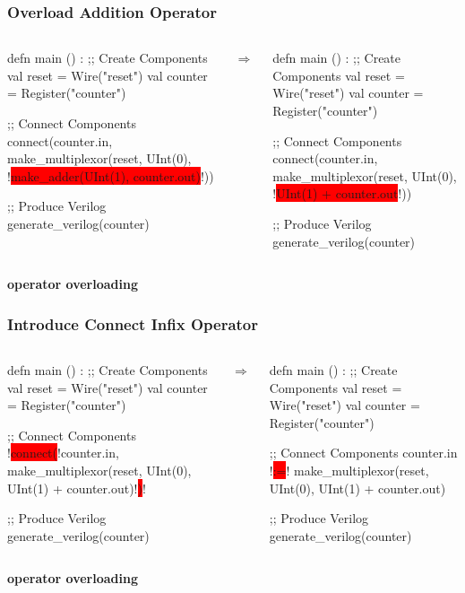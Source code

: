 \documentclass[xcolor=pdflatex,dvipsnames,table]{beamer}
\begin{document}
\begin{frame}[fragile]
\frametitle{Overload Addition Operator}
\begin{columns}
{
\begin{stanza}
defn main () :
  ;; Create Components
  val reset   = Wire("reset")
  val counter = Register("counter")

  ;; Connect Components
  connect(counter.in, 
    make_multiplexor(reset,
      UInt(0),
      !\colorbox{red}{make\_adder(UInt(1), counter.out)}!))

  ;; Produce Verilog
  generate_verilog(counter)
\end{stanza}
}
\begin{center}
$\Rightarrow$
\end{center}
{
\begin{stanza}
defn main () :
  ;; Create Components
  val reset   = Wire("reset")
  val counter = Register("counter")

  ;; Connect Components
  connect(counter.in, 
    make_multiplexor(reset,
      UInt(0),
      !\colorbox{red}{UInt(1) + counter.out}!))

  ;; Produce Verilog
  generate_verilog(counter)
\end{stanza}
}
\end{columns}
\vspace{1cm}
{\bf operator overloading}
\end{frame}

\begin{frame}[fragile]
\frametitle{Introduce Connect Infix Operator}
\begin{columns}
{
\begin{stanza}
defn main () :
  ;; Create Components
  val reset   = Wire("reset")
  val counter = Register("counter")

  ;; Connect Components
  !\colorbox{red}{connect(}!counter.in, 
    make_multiplexor(reset,
      UInt(0),
      UInt(1) + counter.out)!\colorbox{red}{)}!

  ;; Produce Verilog
  generate_verilog(counter)
\end{stanza}
}
\begin{center}
$\Rightarrow$
\end{center}
{
\begin{stanza}
defn main () :
  ;; Create Components
  val reset   = Wire("reset")
  val counter = Register("counter")

  ;; Connect Components
  counter.in !\colorbox{red}{:=}!
    make_multiplexor(reset,
      UInt(0),
      UInt(1) + counter.out)

  ;; Produce Verilog
  generate_verilog(counter)
\end{stanza}
}
\end{columns}
\vspace{1cm}
{\bf operator overloading}
\end{frame}
\end{document}
